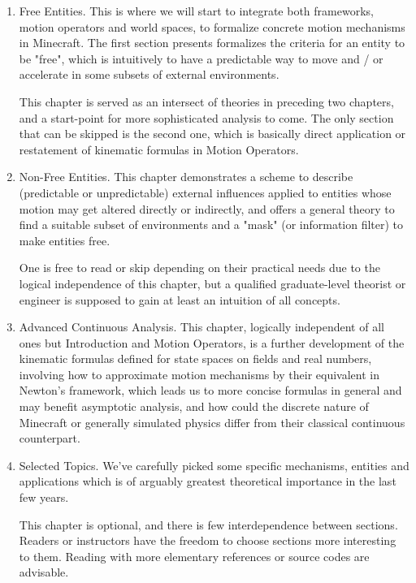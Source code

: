\documentclass{book}
\theoremstyle{definition}\newtheorem{mechanism}{Mechanism}
\theoremstyle{remark}\newtheorem*{remark}{Remark}
\begin{document}
\begin{enumerate}
	A reader must finish all sections to establish a good grounding to read upcoming chapters.
	
	\item Free Entities. This is where we will start to integrate both frameworks, motion operators and world spaces, to formalize concrete motion mechanisms in Minecraft. The first section presents formalizes the criteria for an entity to be "free", which is intuitively to have a predictable way to move and / or accelerate in some subsets of external environments.
	
	This chapter is served as an intersect of theories in preceding two chapters, and a start-point for more sophisticated analysis to come. The only section that can be skipped is the second one, which is basically direct application or restatement of kinematic formulas in Motion Operators.
	
	\item Non-Free Entities. This chapter demonstrates a scheme to describe (predictable or unpredictable) external influences applied to entities whose motion may get altered directly or indirectly, and offers a general theory to find a suitable subset of environments and a "mask" (or information filter) to make entities free.
	
	One is free to read or skip depending on their practical needs due to the logical independence of this chapter, but a qualified graduate-level theorist or engineer is supposed to gain at least an intuition of all concepts.
	
	\item Advanced Continuous Analysis. This chapter, logically independent of all ones but Introduction and Motion Operators, is a further development of the kinematic formulas defined for state spaces on fields and real numbers, involving how to approximate motion mechanisms by their equivalent in Newton's framework, which leads us to more concise formulas in general and may benefit asymptotic analysis, and how could the discrete nature of Minecraft or generally simulated physics differ from their classical continuous counterpart.
	
	\item Selected Topics. We've carefully picked some specific mechanisms, entities and applications which is of arguably greatest theoretical importance in the last few years.
	
	This chapter is optional, and there is few interdependence between sections. Readers or instructors have the freedom to choose sections more interesting to them. Reading with more elementary references or source codes are advisable.
\end{enumerate}
\end{document}
